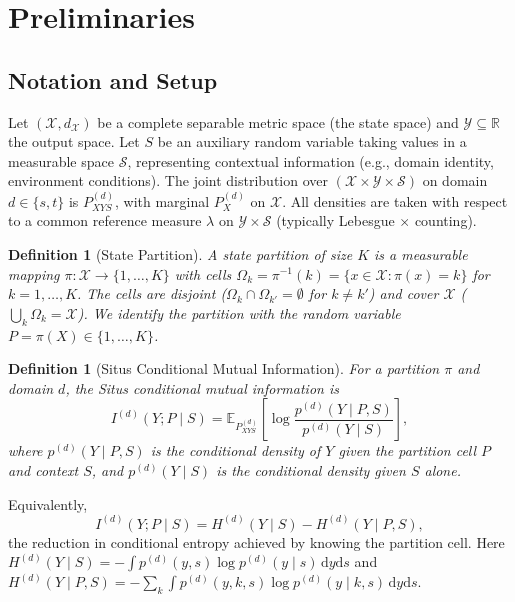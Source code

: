 \documentclass[12pt,a4paper]{article}
\newtheorem{definition}[theorem]{Definition}
\newcommand{\R}{\mathbb{R}}
\newcommand{\E}{\mathbb{E}}
\newcommand{\cX}{\mathcal{X}}
\newcommand{\cY}{\mathcal{Y}}
\newcommand{\cS}{\mathcal{S}}
\begin{document}
\section{Preliminaries}
\label{sec:prelim}

\subsection{Notation and Setup}

Let $(\cX,d_{\cX})$ be a complete separable metric space (the state space)
and $\cY\subseteq\R$ the output space.  Let $S$ be an auxiliary random
variable taking values in a measurable space $\cS$, representing contextual
information (e.g., domain identity, environment conditions).  The joint
distribution over $(\cX\times\cY\times\cS)$ on domain $d\in\{s,t\}$ is
$P^{(d)}_{XYS}$, with marginal $P^{(d)}_X$ on $\cX$.
All densities are taken with respect to a common reference measure
$\lambda$ on $\cY\times\cS$ (typically Lebesgue $\times$ counting).

\begin{definition}[State Partition]
\label{def:partition}
A \emph{state partition} of size $K$ is a measurable mapping
$\pi:\cX\to\{1,\dots,K\}$ with cells
$\Omega_k = \pi^{-1}(k) = \{x\in\cX: \pi(x)=k\}$ for $k=1,\dots,K$.
The cells are disjoint ($\Omega_k\cap\Omega_{k'}=\emptyset$ for $k\neq k'$)
and cover $\cX$ ($\bigcup_k\Omega_k=\cX$).  We identify the partition with
the random variable $P=\pi(X)\in\{1,\dots,K\}$.
\end{definition}

\begin{definition}[Situs Conditional Mutual Information]
\label{def:situs-mi}
For a partition $\pi$ and domain $d$, the Situs conditional mutual
information is
\begin{equation}\label{eq:situs-mi}
    I^{(d)}(Y;P\mid S) =
    \E_{P^{(d)}_{XYS}}\!\left[
        \log\frac{p^{(d)}(Y\mid P,S)}
                  {p^{(d)}(Y\mid S)}
    \right],
\end{equation}
where $p^{(d)}(Y\mid P,S)$ is the conditional density of $Y$ given the
partition cell $P$ and context $S$, and $p^{(d)}(Y\mid S)$ is the
conditional density given $S$ alone.
\end{definition}

Equivalently,
\begin{equation}\label{eq:situs-mi-entropy}
I^{(d)}(Y;P\mid S)=H^{(d)}(Y\mid S)-H^{(d)}(Y\mid P,S),
\end{equation}
the reduction in conditional entropy achieved by knowing the partition cell.
Here $H^{(d)}(Y\mid S)=-\int p^{(d)}(y,s)\log p^{(d)}(y\mid s)\,\mathrm{d}y\mathrm{d}s$
and $H^{(d)}(Y\mid P,S)=-\sum_{k}\int p^{(d)}(y,k,s)\log p^{(d)}(y\mid k,s)\,\mathrm{d}y\mathrm{d}s$.
\end{document}
